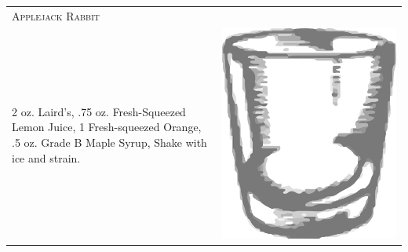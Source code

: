 \documentclass{article}
\begin{document}
\begin{multicols}{2}
\begin{tabular}{p{2in} p{0.5in}}
\multicolumn{2}{p{3in}}{\centering\Huge\textsc{Applejack Rabbit}} \\
  \vspace{-0.1in}2 oz. Laird's, .75 oz. Fresh-Squeezed Lemon Juice, 1 Fresh-squeezed Orange, .5 oz. Grade B Maple Syrup, Shake with ice and strain.&
  \vspace{-0.1in} \includegraphics{rocks_glass.png}
\end{tabular}


\end{multicols}
\end{document}
